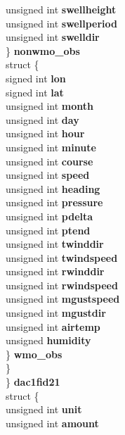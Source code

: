 \begin{DoxyCompactItemize}
{\begin{tabbing}
{{\>\>\>\>\>\>unsigned int {\bfseries swellheight}\\
\>\>\>\>\>\>unsigned int {\bfseries swellperiod}\\
\>\>\>\>\>\>unsigned int {\bfseries swelldir}\\
\>\>\>\>\>\} {\bfseries nonwmo\_obs}\\
\>\>\>\>\>struct \{\\
\>\>\>\>\>\>signed int {\bfseries lon}\\
\>\>\>\>\>\>signed int {\bfseries lat}\\
\>\>\>\>\>\>unsigned int {\bfseries month}\\
\>\>\>\>\>\>unsigned int {\bfseries day}\\
\>\>\>\>\>\>unsigned int {\bfseries hour}\\
\>\>\>\>\>\>unsigned int {\bfseries minute}\\
\>\>\>\>\>\>unsigned int {\bfseries course}\\
\>\>\>\>\>\>unsigned int {\bfseries speed}\\
\>\>\>\>\>\>unsigned int {\bfseries heading}\\
\>\>\>\>\>\>unsigned int {\bfseries pressure}\\
\>\>\>\>\>\>unsigned int {\bfseries pdelta}\\
\>\>\>\>\>\>unsigned int {\bfseries ptend}\\
\>\>\>\>\>\>unsigned int {\bfseries twinddir}\\
\>\>\>\>\>\>unsigned int {\bfseries twindspeed}\\
\>\>\>\>\>\>unsigned int {\bfseries rwinddir}\\
\>\>\>\>\>\>unsigned int {\bfseries rwindspeed}\\
\>\>\>\>\>\>unsigned int {\bfseries mgustspeed}\\
\>\>\>\>\>\>unsigned int {\bfseries mgustdir}\\
\>\>\>\>\>\>unsigned int {\bfseries airtemp}\\
\>\>\>\>\>\>unsigned {\bfseries humidity}\\
\>\>\>\>\>\} {\bfseries wmo\_obs}\\
\>\>\>\>\} }\label{structais__t_1_1@34_1_1@39_1_1@59_1_1@67_ab274330a2157ecf053f7216534d525ae}
\\
\>\>\>\} {\bfseries dac1fid21}\\
\>\>\>struct \{\\
\>\>\>\>unsigned int {\bfseries unit}\\
\>\>\>\>unsigned int {\bfseries amount}\\
}
\end{tabbing}}
\end{DoxyCompactItemize}
